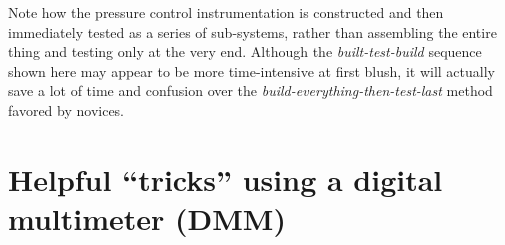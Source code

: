 Note how the pressure control instrumentation is constructed and then immediately tested as a series of sub-systems, rather than assembling the entire thing and testing only at the very end.  Although the \textit{built-test-build} sequence shown here may appear to be more time-intensive at first blush, it will actually save a lot of time and confusion over the \textit{build-everything-then-test-last} method favored by novices.




































\filbreak
\section{Helpful ``tricks'' using a digital multimeter (DMM)}

